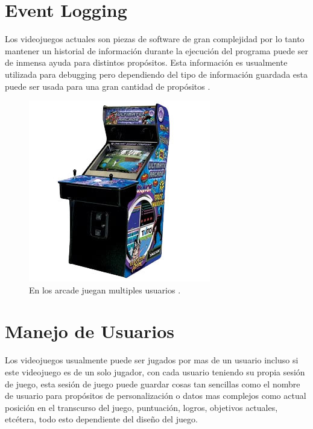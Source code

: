 \section{Event Logging}
Los videojuegos actuales son piezas de software de gran complejidad por lo tanto mantener un historial de información durante la ejecución del programa puede ser de inmensa ayuda para distintos propósitos. Esta información es usualmente utilizada para debugging pero dependiendo del tipo de información guardada esta puede ser usada para una gran cantidad de propósitos \cite{colm_tracing}.
\newpage
\setlength\intextsep{0pt}
\begin{figure}
\includegraphics[width=\linewidth]{media/arcade-machines.jpg}
\caption{En los arcade juegan multiples usuarios \cite{arcade_score}.}
\label{fig:arcade}
\end{figure}
\section{Manejo de Usuarios}
Los videojuegos usualmente puede ser jugados por mas de un usuario incluso si este videojuego es de un solo jugador, con cada usuario teniendo su propia sesión de juego, esta sesión de juego puede guardar cosas tan sencillas como el nombre de usuario para propósitos de personalización o datos mas complejos como actual posición en el transcurso del juego, puntuación, logros, objetivos actuales, etcétera, todo esto dependiente del diseño del juego.

